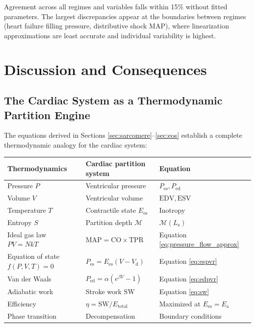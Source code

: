 \documentclass[10pt,twocolumn,a4paper]{article}
\theoremstyle{remark}
\newcommand{\Ees}{E_{\mathrm{es}}}
\newcommand{\Ea}{E_{\mathrm{a}}}
\newcommand{\Vd}{V_{\mathrm{d}}}
\newcommand{\Pes}{P_{\mathrm{es}}}
\newcommand{\CO}{\mathrm{CO}}
\newcommand{\MAP}{\mathrm{MAP}}
\newcommand{\TPR}{\mathrm{TPR}}
\newcommand{\EDV}{\mathrm{EDV}}
\newcommand{\ESV}{\mathrm{ESV}}
\newcommand{\SW}{\mathrm{SW}}
\newcommand{\Ls}{L_{\mathrm{s}}}
\begin{document}
Agreement across all regimes and variables falls within 15\% without fitted parameters. The largest discrepancies appear at the boundaries between regimes (heart failure filling pressure, distributive shock MAP), where linearization approximations are least accurate and individual variability is highest.

\section{Discussion and Consequences}
\label{sec:discussion}

\subsection{The Cardiac System as a Thermodynamic Partition Engine}

The equations derived in Sections \ref{sec:sarcomere}--\ref{sec:eos} establish a complete thermodynamic analogy for the cardiac system:

\begin{center}
\begin{tabular}{lll}
\toprule
\textbf{Thermodynamics} & \textbf{Cardiac partition system} & \textbf{Equation} \\
\midrule
Pressure $P$ & Ventricular pressure & $P_{\mathrm{es}}, P_{\mathrm{ed}}$ \\
Volume $V$ & Ventricular volume & $\EDV, \ESV$ \\
Temperature $T$ & Contractile state $\Ees$ & Inotropy \\
Entropy $S$ & Partition depth $\mathcal{M}$ & $\mathcal{M}(\Ls)$ \\
Ideal gas law $PV = NkT$ & $\MAP = \CO \times \TPR$ & Equation \ref{eq:pressure_flow_approx} \\
Equation of state $f(P,V,T)=0$ & $\Pes = \Ees(V-\Vd)$ & Equation \ref{eq:espvr} \\
Van der Waals & $P_{\mathrm{ed}} = \alpha(e^{\beta V}-1)$ & Equation \ref{eq:edpvr} \\
Adiabatic work & Stroke work $\SW$ & Equation \ref{eq:sw} \\
Efficiency & $\eta = \SW/E_{\mathrm{total}}$ & Maximized at $\Ees = \Ea$ \\
Phase transition & Decompensation & Boundary conditions \\
\bottomrule
\end{tabular}
\end{center}
\end{document}
